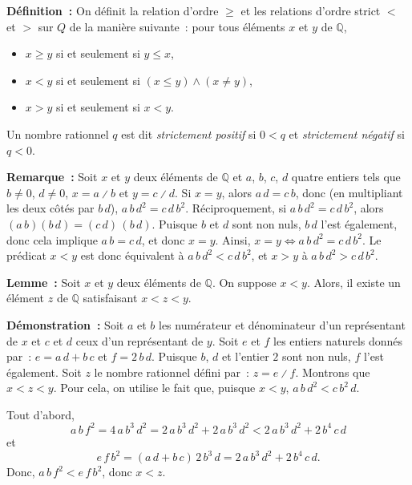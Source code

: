     \done

\medskip

\noindent\textbf{Définition :} On définit la relation d'ordre $\geq$ et les relations d'ordre strict $<$ et $>$ sur $Q$ de la manière suivante : pour tous éléments $x$ et $y$ de $\mathbb{Q}$, 
\begin{itemize}[nosep]
    \item $x \geq y$ si et seulement si $y \leq x$,
    \item $x < y$ si et seulement si $(x \leq y) \wedge (x \neq y)$,
    \item $x > y$ si et seulement si $x < y$.
\end{itemize}
Un nombre rationnel $q$ est dit \emph{strictement positif} si $0 < q$ et \emph{strictement négatif} si $q < 0$.

\medskip

\noindent\textbf{Remarque :}
    Soit $x$ et $y$ deux éléments de $\mathbb{Q}$ et $a$, $b$, $c$, $d$ quatre entiers tels que $b \neq 0$, $d \neq 0$, $x = a \divslash b$ et $y = c \divslash d$.
    Si $x = y$, alors $a \, d = c \, b$, donc (en multipliant les deux côtés par $b \, d$), $a \, b \, d^2 = c \, d \, b^2$.
    Réciproquement, si $a \, b \, d^2 = c \, d \, b^2$, alors $(a \, b) (b \, d) = (c \, d) \, (b \, d)$.
    Puisque $b$ et $d$ sont non nuls, $b \, d$ l'est également, donc cela implique $a \, b = c \, d$, et donc $x = y$.
    Ainsi, $x = y \Leftrightarrow a \, b \, d^2 = c \, d \, b^2$.
    Le prédicat $x < y$ est donc équivalent à $a \, b \, d^2 < c \, d \, b^2$, et $x > y$ à $a \, b \, d^2 > c \, d \, b^2$.

\medskip

\noindent\textbf{Lemme :} Soit $x$ et $y$ deux éléments de $\mathbb{Q}$. 
    On suppose $x < y$. 
    Alors, il existe un élément $z$ de $\mathbb{Q}$ satisfaisant $x < z < y$. 

\medskip

\noindent\textbf{Démonstration :} Soit $a$ et $b$ les numérateur et dénominateur d'un représentant de $x$ et $c$ et $d$ ceux d'un représentant de $y$. 
    Soit $e$ et $f$ les entiers naturels donnés par : $e = a \, d + b \, c$ et $f = 2 \, b \, d$.
    Puisque $b$, $d$ et l'entier $2$ sont non nuls, $f$ l'est également.
    Soit $z$ le nombre rationnel défini par : $z = e \divslash f$.
    Montrons que $x < z < y$. 
    Pour cela, on utilise le fait que, puisque $x < y$, $a \, b \, d^2 < c \, b^2 \, d$.

    Tout d'abord, 
    \begin{equation*}
        a \, b \, f^2 
        = 4 \, a \, b^3 \, d^2
        = 2 \, a \, b^3 \, d^2 + 2 \, a \, b^3 \, d^2
        < 2 \, a \, b^3 \, d^2 + 2 \, b^4 \, c \, d 
    \end{equation*}
    et 
    \begin{equation*}
        e \, f \, b^2
        = (a \, d + b \, c) \, 2 \, b^3 \, d
        = 2 \, a \, b^3 \, d^2 + 2 \, b^4 \, c \, d. 
    \end{equation*}
    Donc, $a \, b \, f^2 < e \, f \, b^2$, donc $x < z$.

